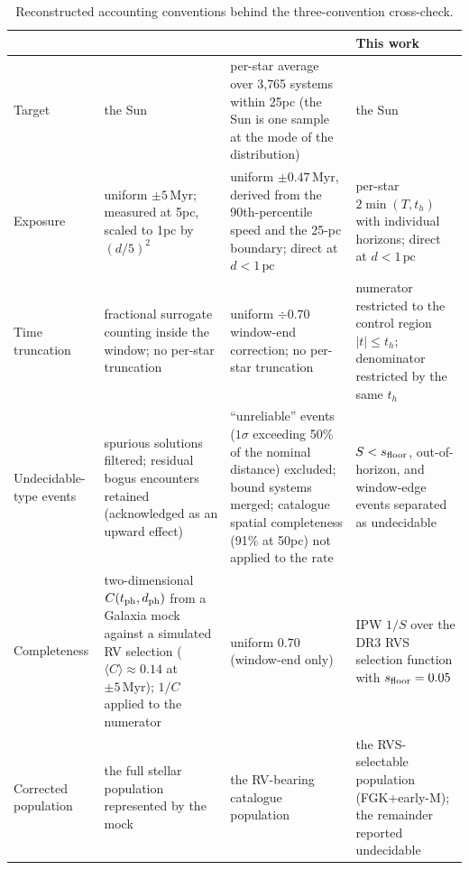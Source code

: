 \documentclass[11pt]{article}
\newcommand{\Myr}{\,\mathrm{Myr}}
\newcommand{\pc}{\,\mathrm{pc}}
\begin{document}
\begin{table}[h]\centering\small
\begin{tabular}{p{2.1cm}p{3.6cm}p{3.9cm}p{3.9cm}}
\toprule
 & \cite{bj18} & \cite{fp26} & This work \\
\midrule
Target & the Sun & per-star average over 3{,}765 systems within 25\;pc (the
Sun is one sample at the mode of the distribution) & the Sun \\[2pt]
Exposure & uniform $\pm5\Myr$; measured at 5\;pc, scaled to 1\;pc by
$(d/5)^2$ & uniform $\pm0.47\Myr$, derived from the 90th-percentile speed
and the 25-pc boundary; direct at $d<1\pc$ & per-star $2\min(T,t_h)$ with
individual horizons; direct at $d<1\pc$ \\[2pt]
Time truncation & fractional surrogate counting inside the window; no
per-star truncation & uniform $\div0.70$ window-end correction; no per-star
truncation & numerator restricted to the control region $|t|\le t_h$;
denominator restricted by the same $t_h$ \\[2pt]
Undecidable-type events & spurious solutions filtered; residual bogus
encounters retained (acknowledged as an upward effect) & ``unreliable''
events ($1\sigma$ exceeding 50\% of the nominal distance) excluded; bound
systems merged; catalogue spatial completeness (91\% at 50\;pc) not applied
to the rate & $S<s_{\rm floor}$, out-of-horizon, and window-edge events
separated as undecidable \\[2pt]
Completeness & two-dimensional $C(t_{\rm ph},d_{\rm ph})$ from a Galaxia
mock against a simulated RV selection ($\langle C\rangle\approx0.14$ at
$\pm5\Myr$); $1/C$ applied to the numerator & uniform $0.70$ (window-end
only) & IPW $1/S$ over the DR3 RVS selection function with
$s_{\rm floor}=0.05$ \\[2pt]
Corrected population & the full stellar population represented by the mock
& the RV-bearing catalogue population & the RVS-selectable population
(FGK+early-M); the remainder reported undecidable \\
\bottomrule
\end{tabular}
\caption{Reconstructed accounting conventions behind the three-convention
cross-check.}
\label{tab:conventions}
\end{table}
\end{document}
